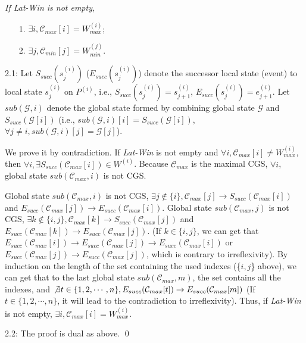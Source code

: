\documentclass[12pt,journal,letterpaper,compsoc]{IEEEtran}
\begin{document}
 {\it If {\it Lat-Win} is not empty,
\begin{itemize}
    \item[1.] $\exists i, \mathcal{C}_{max}[i] = W^{(i)}_{max}$;
    \item[2.] $\exists j, \mathcal{C}_{min}[j] = W^{(j)}_{min}$.
\end{itemize}}


2.1: Let $S_{succ}(s^{(i)}_j)$ ($E_{succ}(s^{(i)}_j)$) denote the successor local state (event) to local state $s^{(i)}_j$ on $P^{(i)}$, i.e., $S_{succ}(s^{(i)}_j) = s^{(i)}_{j+1}$, $E_{succ}(s^{(i)}_j) = e^{(i)}_{j+1}$. Let $sub(\mathcal{G}, i)$ denote the global state formed by combining global state $\mathcal{G}$ and $S_{succ}(\mathcal{G}[i])$ (i.e., $sub(\mathcal{G}, i)[i] = S_{succ}(\mathcal{G}[i])$, $\forall j\neq i, sub(\mathcal{G}, i)[j] = \mathcal{G}[j]$).

We prove it by contradiction. If {\it Lat-Win} is not empty and $\forall i, \mathcal{C}_{max}[i] \neq W^{(i)}_{max}$, then $\forall i, \exists S_{succ}(\mathcal{C}_{max}[i]) \in W^{(i)}$. Because $\mathcal{C}_{max}$ is the maximal CGS, $\forall i$, global state $sub(\mathcal{C}_{max}, i)$ is not CGS.

Global state $sub(\mathcal{C}_{max}, i)$ is not CGS, $\exists j\not\in \{i\}, \mathcal{C}_{max}[j]\rightarrow S_{succ}(\mathcal{C}_{max}[i])$ and $E_{succ}(\mathcal{C}_{max}[j]) \rightarrow E_{succ}(\mathcal{C}_{max}[i])$. Global state $sub(\mathcal{C}_{max}, j)$ is not CGS, $\exists k\not\in \{i, j\}, \mathcal{C}_{max}[k]\rightarrow S_{succ}(\mathcal{C}_{max}[j])$ and $E_{succ}(\mathcal{C}_{max}[k]) \rightarrow E_{succ}(\mathcal{C}_{max}[j])$. (If $k \in \{i, j\}$, we can get that $E_{succ}(\mathcal{C}_{max}[i]) \rightarrow E_{succ}(\mathcal{C}_{max}[j]) \rightarrow E_{succ}(\mathcal{C}_{max}[i])$ or $E_{succ}(\mathcal{C}_{max}[j]) \rightarrow E_{succ}(\mathcal{C}_{max}[j])$, which is contrary to irreflexivity). By induction on the length of the set containing the used indexes (\{$i, j$\} above), we can get that to the last global state $sub(\mathcal{C}_{max}, m)$, the set contains all the indexes, and $\not\exists t\in \{1, 2, \cdots, n\}, E_{succ}(\mathcal{C}_{max}[t]) \rightarrow E_{succ}(\mathcal{C}_{max}[m])$ (If $t\in \{1, 2, \cdots, n\}$, it will lead to the contradiction to irreflexivity). Thus, if {\it Lat-Win} is not empty, $\exists i, \mathcal{C}_{max}[i] = W^{(i)}_{max}$.

2.2: The proof is dual as above. \qed \\
\end{document}
